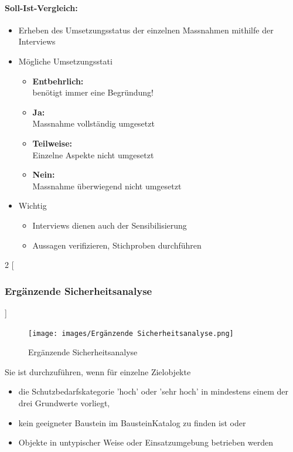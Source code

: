 \documentclass[10pt,a4paper]{article}
\begin{document}
\pagebreak
\paragraph*{Soll-Ist-Vergleich:}
\begin{itemize}[noitemsep,topsep=0pt,leftmargin=*]
    \item Erheben des Umsetzungsstatus der einzelnen Massnahmen mithilfe der Interviews
    \item Mögliche Umsetzungsstati
    \begin{itemize}[noitemsep,topsep=0pt,leftmargin=*]
        \item \textbf{Entbehrlich:}\\benötigt immer eine Begründung!
        \item \textbf{Ja:}\\Massnahme vollständig umgesetzt
        \item \textbf{Teilweise:}\\Einzelne Aspekte nicht umgesetzt
        \item \textbf{Nein:}\\Massnahme überwiegend nicht umgesetzt
    \end{itemize}
    \item Wichtig
    \begin{itemize}[noitemsep,topsep=0pt,leftmargin=*]
        \item Interviews dienen auch der Sensibilisierung
        \item Aussagen verifizieren, Stichproben durchführen
    \end{itemize}
\end{itemize}

\begin{multicols}{2}
    [\subsubsection*{Ergänzende Sicherheitsanalyse}]
    \begin{figure}[H]
        \begin{center}
        \texttt{[image: images/Ergänzende Sicherheitsanalyse.png]}
        \caption{Ergänzende Sicherheitsanalyse}
        \label{Ergänzende Sicherheitsanalyse}
        \end{center}
    \end{figure}
    \noindent
    Sie ist durchzuführen, wenn für einzelne Zielobjekte
\begin{itemize}[noitemsep,topsep=0pt,leftmargin=*]
    \item die Schutzbedarfskategorie 'hoch' oder
    'sehr hoch' in mindestens einem der drei
    Grundwerte vorliegt,
    \item kein geeigneter Baustein im BausteinKatalog zu finden ist oder
    \item Objekte in untypischer Weise oder
    Einsatzumgebung betrieben werden
\end{itemize}
\end{multicols}
\end{document}
